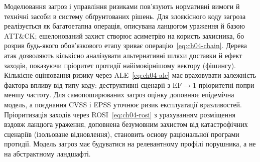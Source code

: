 Моделювання загроз і управління ризиками пов'язують нормативні вимоги й технічні засоби в систему обґрунтованих рішень. Для злоякісного коду загроза реалізується як багатоетапна операція, описувана ланцюгом ураження й базою ATT\&CK; ешелонований захист створює асиметрію на користь захисника, бо розрив будь-якого обов'язкового етапу зриває операцію~\eqref{eq:ch04-chain}. Дерева атак дозволяють кількісно аналізувати альтернативні шляхи доставки й ефект заходів, показуючи пріоритет протидії найімовірнішому вектору (фішингу). Кількісне оцінювання ризику через ALE~\eqref{eq:ch04-ale} має враховувати залежність фактора впливу від типу коду: деструктивні сценарії з $\mathrm{EF}\to1$ пріоритетні попри меншу частоту. Для самопоширюваних загроз оцінку доповнює епідемічна модель, а поєднання CVSS і EPSS уточнює ризик експлуатації вразливостей. Пріоритизація заходів через ROSI~\eqref{eq:ch04-rosi} з урахуванням розміщення вздовж ланцюга ураження, доповнена безумовним захистом від катастрофічних сценаріїв (ізольоване відновлення), становить основу раціональної програми протидії. Модель загроз має будуватися на релевантному профілі порушника, а не на абстрактному ландшафті.

